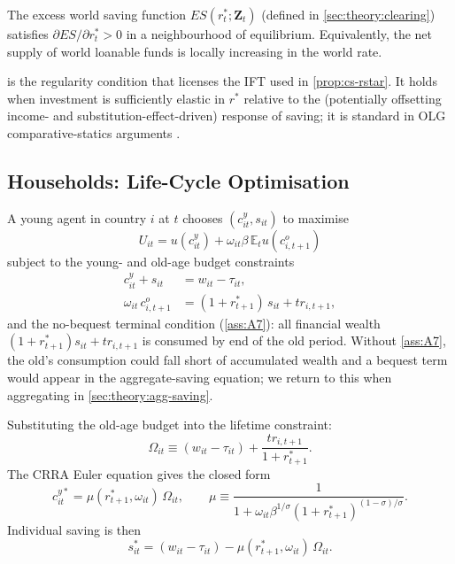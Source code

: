 \begin{assumption}\label{ass:A9}
The excess world saving function $ES(r_t^*;\mathbf Z_t)$ (defined in
\cref{sec:theory:clearing}) satisfies $\partial ES/\partial r_t^*>0$ in a
neighbourhood of equilibrium. Equivalently, the net supply of world loanable
funds is locally increasing in the world rate.
\end{assumption}

 is the regularity condition that licenses the IFT used in
\cref{prop:cs-rstar}. It holds when investment is sufficiently elastic in
$r^*$ relative to the (potentially offsetting income- and
substitution-effect-driven) response of saving; it is standard in
OLG comparative-statics arguments \citep{Diamond1965}.

\subsection{Households: Life-Cycle Optimisation}\label{sec:theory:households}

A young agent in country $i$ at $t$ chooses $(c_{it}^y,s_{it})$ to maximise
\[
U_{it}=u(c_{it}^y)+\omega_{it}\beta\,\mathbb{E}_t u(c_{i,t+1}^o)
\]
subject to the young- and old-age budget constraints
\begin{align}
c_{it}^y+s_{it}&=w_{it}-\tau_{it}, \\
\omega_{it}\,c_{i,t+1}^o&=(1+r_{t+1}^*)\,s_{it}+tr_{i,t+1},
\end{align}
and the no-bequest terminal condition (\cref{ass:A7}): all financial wealth
$(1+r_{t+1}^*)s_{it}+tr_{i,t+1}$ is consumed by end of the old period.
Without \cref{ass:A7}, the old's consumption could fall short of accumulated
wealth and a bequest term would appear in the aggregate-saving equation; we
return to this when aggregating in \cref{sec:theory:agg-saving}.

Substituting the old-age budget into the lifetime constraint:
\[
\Omega_{it}\equiv (w_{it}-\tau_{it})+\frac{tr_{i,t+1}}{1+r_{t+1}^*}.
\]
The CRRA Euler equation gives the closed form
\begin{equation}
c_{it}^{y*}=\mu(r_{t+1}^*,\omega_{it})\,\Omega_{it},\qquad
\mu\equiv\frac{1}{1+\omega_{it}\beta^{1/\sigma}(1+r_{t+1}^*)^{(1-\sigma)/\sigma}}.
\label{eq:mu}
\end{equation}
Individual saving is then
\begin{equation}
s_{it}^*=(w_{it}-\tau_{it})-\mu(r_{t+1}^*,\omega_{it})\,\Omega_{it}.
\label{eq:savind}
\end{equation}

